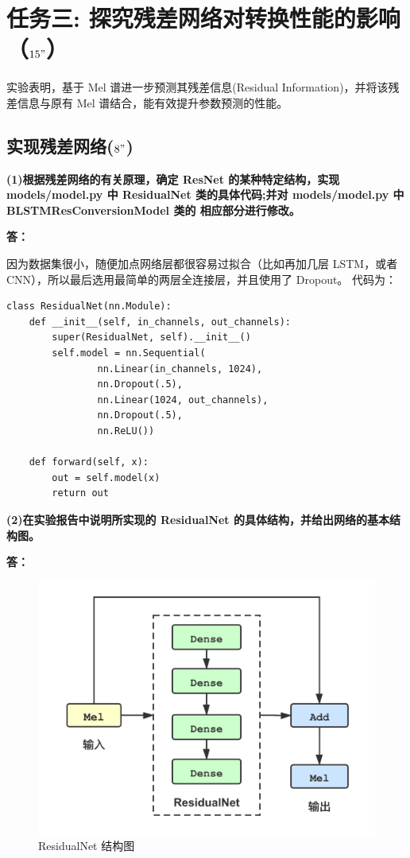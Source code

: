 \documentclass[degree=project,degree-type=project,cjk-font=noto]{thuthesis}
\begin{document}
\chapter{任务三: 探究残差网络对转换性能的影响（$15"$）}

实验表明，基于 Mel 谱进一步预测其残差信息(Residual Information)，并将该残差信息与原有 Mel 谱结合，能有效提升参数预测的性能。

\section{实现残差网络($8"$)}

\textbf{(1)根据残差网络的有关原理，确定 ResNet 的某种特定结构，实现 models/model.py 中 ResidualNet 类的具体代码;并对 models/model.py 中 BLSTMResConversionModel 类的 相应部分进行修改。}

\textbf{答：}

因为数据集很小，随便加点网络层都很容易过拟合（比如再加几层 LSTM，或者 CNN），所以最后选用最简单的两层全连接层，并且使用了 Dropout\cite{dropout}。
代码为：

\begin{verbatim}
class ResidualNet(nn.Module):
    def __init__(self, in_channels, out_channels):
        super(ResidualNet, self).__init__()
        self.model = nn.Sequential(
                nn.Linear(in_channels, 1024),
                nn.Dropout(.5),
                nn.Linear(1024, out_channels),
                nn.Dropout(.5),
                nn.ReLU())

    def forward(self, x):
        out = self.model(x)
        return out
\end{verbatim}

\textbf{(2)在实验报告中说明所实现的 ResidualNet 的具体结构，并给出网络的基本结构图。}

\textbf{答：}

\begin{figure}[h]
\centering%
\includegraphics[width=.75\linewidth]{ResNet.png}
  \caption{ResidualNet 结构图}
  \label{fig:resnet}
\end{figure}
\end{document}
